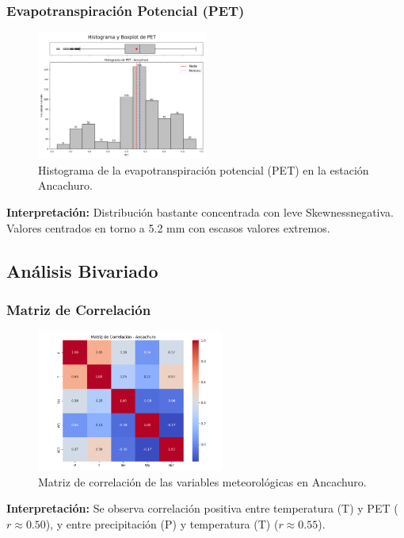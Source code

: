\subsubsection*{Evapotranspiración Potencial (PET)}
\begin{figure}[H]
\centering
\includegraphics[width=0.5\textwidth]{resultados/por_estacion_meteorologica/Ancachuro/PET_histograma.png}
\caption{Histograma de la evapotranspiración potencial (PET) en la estación Ancachuro.}
\label{fig:ancachuro_PET}
\end{figure}
\textbf{Interpretación:} Distribución bastante concentrada con leve Skewnessnegativa. Valores centrados en torno a 5.2 mm con escasos valores extremos.

\subsection{Análisis Bivariado}

\subsubsection*{Matriz de Correlación}
\begin{figure}[H]
\centering
\includegraphics[width=0.55\textwidth]{resultados/por_estacion_meteorologica/Ancachuro/matriz_correlacion.png}
\caption{Matriz de correlación de las variables meteorológicas en Ancachuro.}
\label{fig:ancachuro_corr}
\end{figure}
\textbf{Interpretación:} Se observa correlación positiva entre temperatura (T) y PET ($r \approx 0.50$), y entre precipitación (P) y temperatura (T) ($r \approx 0.55$).

